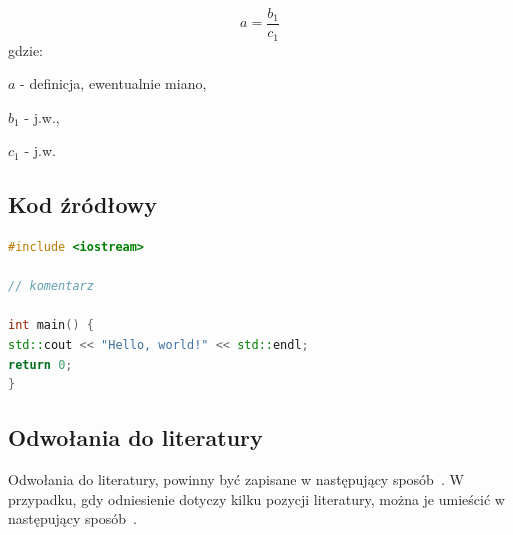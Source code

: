 \begin{equation}
a = \frac{b_1}{c_1}
\end{equation}
gdzie: 

$a$ - definicja, ewentualnie miano,

$b_1$ - j.w., 

$c_1$ - j.w. 


\subsection{Kod źródłowy}







\begin{lstlisting}[language=C++,caption={Przykładowy kod C++}, label={lst:sample-code}]
#include <iostream>

// komentarz

int main() {
std::cout << "Hello, world!" << std::endl;
return 0;
}
\end{lstlisting}





\subsection{Odwołania do literatury}

Odwołania do literatury, powinny być zapisane w następujący sposób~\cite{Led2004}. W przypadku, gdy odniesienie dotyczy kilku pozycji literatury, można je umieścić w następujący sposób~\cite{srodowiska200łz,Led2004,pernice_2022}. 


